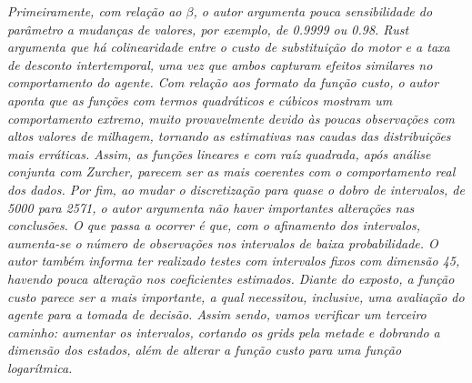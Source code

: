 \documentclass[12pt,a4paper]{article}
\begin{document}
\emph{Primeiramente, com relação ao \(\beta\), o autor argumenta pouca
sensibilidade do parâmetro a mudanças de valores, por exemplo, de 0.9999
ou 0.98. Rust argumenta que há colinearidade entre o custo de
substituição do motor e a taxa de desconto intertemporal, uma vez que
ambos capturam efeitos similares no comportamento do agente. Com relação
aos formato da função custo, o autor aponta que as funções com termos
quadráticos e cúbicos mostram um comportamento extremo, muito
provavelmente devido às poucas observações com altos valores de
milhagem, tornando as estimativas nas caudas das distribuições mais
erráticas. Assim, as funções lineares e com raíz quadrada, após análise
conjunta com Zurcher, parecem ser as mais coerentes com o comportamento
real dos dados. Por fim, ao mudar o discretização para quase o dobro de
intervalos, de 5000 para 2571, o autor argumenta não haver importantes
alterações nas conclusões. O que passa a ocorrer é que, com o afinamento
dos intervalos, aumenta-se o número de observações nos intervalos de
baixa probabilidade. O autor também informa ter realizado testes com
intervalos fixos com dimensão 45, havendo pouca alteração nos
coeficientes estimados. Diante do exposto, a função custo parece ser a
mais importante, a qual necessitou, inclusive, uma avaliação do agente
para a tomada de decisão. Assim sendo, vamos verificar um terceiro
caminho: aumentar os intervalos, cortando os grids pela metade e
dobrando a dimensão dos estados, além de alterar a função custo para uma
função logarítmica.}
\end{document}
